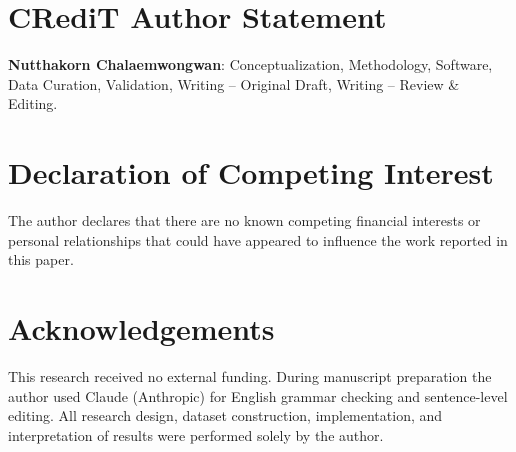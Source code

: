 \documentclass[review]{elsarticle}
\begin{document}
\section{CRediT Author Statement}

\textbf{Nutthakorn Chalaemwongwan}: Conceptualization, Methodology, Software, Data Curation, Validation, Writing -- Original Draft, Writing -- Review \& Editing.


\section{Declaration of Competing Interest}

The author declares that there are no known competing financial interests or personal relationships that could have appeared to influence the work reported in this paper.


\section{Acknowledgements}

This research received no external funding. During manuscript preparation the author used Claude (Anthropic) for English grammar checking and sentence-level editing. All research design, dataset construction, implementation, and interpretation of results were performed solely by the author.
\end{document}
